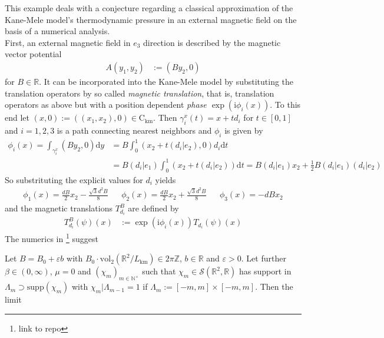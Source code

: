 \begin{exa}
\label{exa:tdpressure}
This example deals with a conjecture regarding a classical approximation of the Kane-Mele model's thermodynamic pressure in an external magnetic field on the basis of a numerical analysis.
\\
First, an external magnetic field in $e_{3}$ direction is described by the magnetic vector potential
\begin{align*}
  A(y_{1},y_{2})
  &:=
  (By_{2},0)
\end{align*}
for $B \in \mathbb{R}$. It can be incorporated into the Kane-Mele model by substituting the translation operators by so called \textit{magnetic translation}, that is, translation operators as above but with a position dependent \textit{phase $\exp(\mathrm{i}\phi_{i}(x))$}. To this end let $(x,0) := ((x_{1},x_{2}),0) \in \mathrm{C}_{\textrm{km}}$. Then $\gamma_{i}^{x}(t) = x +td_{i}$ for $t \in [0,1]$ and $i =1,2,3$ is a path connecting nearest neighbors and $\phi_{i}$ is given by
\begin{align*}
  \phi_{i}(x)
  =
  \int_{\gamma_{i}^{x}}
  (By_{2},0)
  \mathrm{d}y
  &=
  B
  \int_{0}^{1}
  (x_{2}+t(d_{i} \vert e_{2}),0)
  d_{i}
  \mathrm{d}t
  \\
  &=
  B
  (d_{i} \vert e_{1})
  \int_{0}^{1}
  (x_{2}+t(d_{i} \vert e_{2}))
  \mathrm{d}t
  =
  B
  (d_{i} \vert e_{1})
  x_{2}
  +
  \frac{1}{2}
  B
  (d_{i} \vert e_{1})
  (d_{i} \vert e_{2})
\end{align*}
So substrituting the explicit values for $d_{i}$ yields
\begin{align*}
  \phi_{1}(x)
  =
  \frac{dB}{2}
  x_{2}
  -
  \frac{\sqrt{3}d^{2}B}{8}
  &&
  \phi_{2}(x)
  =
  \frac{dB}{2}
  x_{2}
  +
  \frac{\sqrt{3}d^{2}B}{8}
  &&
  \phi_{3}(x)
  =
  -
  dBx_{2}
\end{align*}
and the magnetic translations $T_{d_{i}}^{B}$ are defined by
\begin{align*}
  T_{d_{i}}^{B}(\psi)(x)
  &:=
  \exp(\mathrm{i}\phi_{i}(x))
  T_{d_{i}}(\psi)(x)
\end{align*}
The numerics in \footnote{link to repo} suggest
\\
\begin{con}
\label{con:pressofkmm}
Let $B = B_{0} + \varepsilon b$ with $B_{0} \cdot \mathrm{vol}_{2}(\mathbb{R}^{2}/L_{\textrm{km}}) \in 2\pi\mathbb{Z}$, $b \in \mathbb{R}$ and $\varepsilon > 0$. Let further $\beta \in (0,\infty)$, $\mu = 0$ and $(\chi_{m})_{m\in\mathbb{N}^{\times}}$ such that $\chi_{m} \in \mathcal{S}(\mathbb{R}^{2},\mathbb{R})$ has support in $\Lambda_{m} \supset \mathrm{supp}(\chi_{m})$ with $\chi_{m} \vert \Lambda_{m-1} = 1$ if $\Lambda_{m} := [-m,m] \times [-m,m]$. Then the limit

\end{con}
\end{exa}
